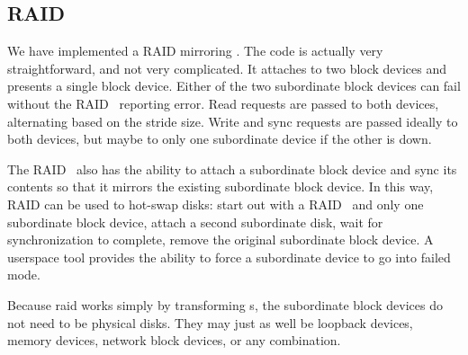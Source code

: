 \subsection{RAID}
\label{sec:modules:raid}

We have implemented a RAID mirroring \module. The code is actually very
straightforward, and not very complicated. It attaches to two block devices and
presents a single block device. Either of the two subordinate block devices can
fail without the RAID \module\ reporting error. Read requests are passed to both
devices, alternating based on the stride size. Write and sync requests are
passed ideally to both devices, but maybe to only one subordinate device if the
other is down.

The RAID \module\ also has the ability to attach a subordinate block device and
sync its contents so that it mirrors the existing subordinate block device. In
this way, RAID can be used to hot-swap disks: start out with a RAID \module\ and
only one subordinate block device, attach a second subordinate disk, wait for
synchronization to complete, remove the original subordinate block device. A
userspace tool provides the ability to force a subordinate device to go into
failed mode.

Because raid works simply by transforming \chdesc s, the subordinate
block devices do not need to be physical disks. They may just as well
be loopback devices, memory devices, network block devices, or any
combination.

